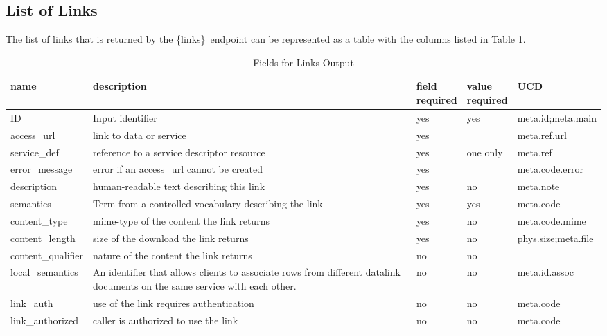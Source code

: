 \documentclass[11pt,a4paper]{ivoa}
\newcommand{\blinks}{\{links\}}
\begin{document}
\subsection{List of Links}
\label{sec:listOfLinks}

The list of links that is returned by the \blinks\ endpoint can be
represented as a table with the columns listed in Table \ref{fig:linkFields}.
\begin{table}[h]
\begin{center}
\begin{tabular}{|l|p{}|p{}|p{}|l|}
\hline
{\bf name}      & {\bf description} & {\bf field \newline required}
                & {\bf value \newline required} & {\bf UCD} \\
\hline
ID              & Input identifier & yes & yes & meta.id;meta.main \\
\hline
access\_url     & link to data or service
                & yes &          & meta.ref.url \\
\cline{1-3} \cline{5-5}
service\_def    & reference to a service descriptor resource
                & yes & one only & meta.ref \\
\cline{1-3} \cline{5-5}
error\_message  & error if an access\_url cannot be created
                & yes &          & meta.code.error \\
\hline
description     & human-readable text describing this link
                & yes & no & meta.note \\
\hline
semantics       & Term from a controlled vocabulary describing the link
                & yes & yes & meta.code \\
\hline
content\_type   & mime-type of the content the link returns
                & yes & no & meta.code.mime \\
\hline
content\_length & size of the download the link returns
                & yes & no & phys.size;meta.file \\
\hline
content\_qualifier & nature of the content the link returns
                & no & no & \\
\hline
local\_semantics &   An identifier that allows clients to associate rows from
  different datalink documents on the same service with each other.
                & no & no & meta.id.assoc \\
\hline
link\_auth       & use of the link requires authentication
                 & no & no & meta.code \\
\hline
link\_authorized & caller is authorized to use the link
                 & no & no & meta.code \\
\hline
\end{tabular}
\end{center}
\caption{Fields for Links Output}
\label{fig:linkFields}
\end{table}
\end{document}
